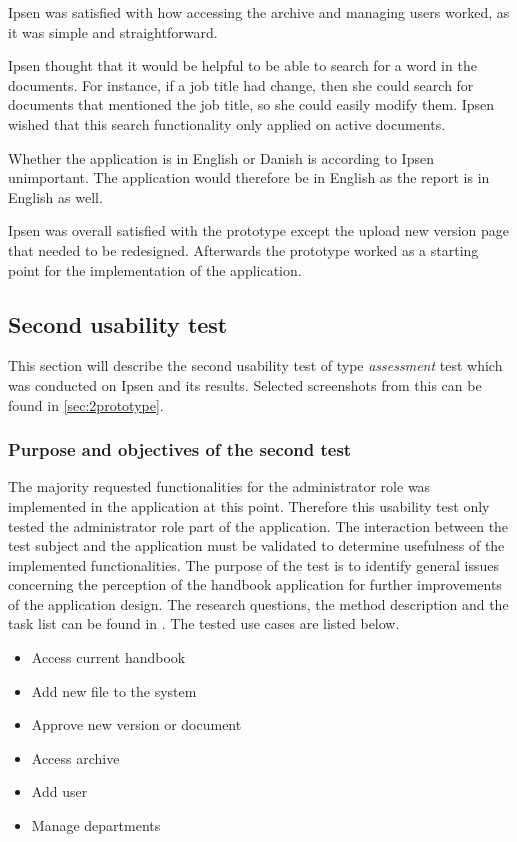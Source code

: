 \documentclass[../../master.tex]{subfiles}
\begin{document}
Ipsen was satisfied with how accessing the archive and managing users worked, as it was simple and straightforward.

Ipsen thought that it would be helpful to be able to search for a word in the documents.
For instance, if a job title had change, then she could search for documents that mentioned the job title, so she could easily modify them.
Ipsen wished that this search functionality only applied on active documents.

Whether the application is in English or Danish is according to Ipsen unimportant.
The application would therefore be in English as the report is in English as well.

Ipsen was overall satisfied with the prototype except the upload new version page that needed to be redesigned.
Afterwards the prototype worked as a starting point for the implementation of the application.

\subsection{Second usability test}\label{secondtest}
This section will describe the second usability test of type \textit{assessment} test which was conducted on Ipsen and its results. Selected screenshots from this can be found in \cref{sec:2prototype}.

\subsubsection*{Purpose and objectives of the second test}
The majority requested functionalities for the administrator role was implemented in the application at this point.
Therefore this usability test only tested the administrator role part of the application.
The interaction between the test subject and the application must be validated to determine usefulness of the implemented functionalities.
The purpose of the test is to identify general issues concerning the perception of the handbook application for further improvements of the application design.
The research questions, the method description and the task list can be found in .
The tested use cases are listed below.

\begin{itemize}
	\item Access current handbook
	\item Add new file to the system
	\item Approve new version or document
	\item Access archive
	\item Add user
	\item Manage departments
\end{itemize}
\end{document}
